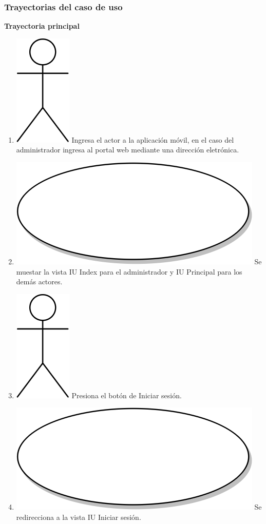 \subsubsection{Trayectorias del caso de uso}
\textbf{Trayectoria principal}
\begin{enumerate}
  \item {\includegraphics[scale=.1]{Capitulo3/img/actor.png} Ingresa el actor a la aplicación móvil, en el caso del administrador ingresa al portal web mediante una dirección eletrónica.}
  \item {\includegraphics[scale=.05]{Capitulo3/img/proceso.png} Se muestar la vista IU Index para el administrador y IU Principal para los demás actores.}
  \item {\includegraphics[scale=.1]{Capitulo3/img/actor.png} Presiona el botón de Iniciar sesión.}
  \item {\includegraphics[scale=.05]{Capitulo3/img/proceso.png} Se redirecciona a la vista IU Iniciar sesión.}

\end{enumerate}
